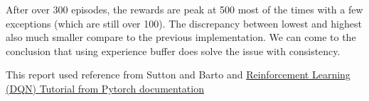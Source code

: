 \documentclass[11pt]{article}
\begin{document}
After over 300 episodes, the rewards are peak at 500 most of the times with a few exceptions (which are still over 100). The discrepancy between lowest and highest also much smaller compare to the previous implementation. We can come to the conclusion that using experience buffer does solve the issue with consistency.

This report used reference from Sutton and Barto and \href{https://pytorch.org/tutorials/intermediate/reinforcement_q_learning.html}{Reinforcement Learning (DQN) Tutorial from Pytorch documentation}


\end{document}
